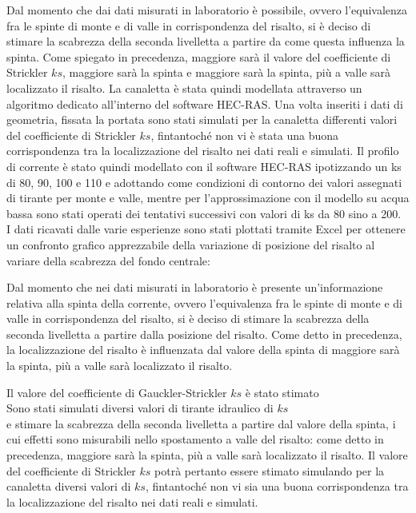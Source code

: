 \documentclass[12pt]{article} %
\begin{document}
\noindent Dal momento che dai dati misurati in laboratorio è possibile, ovvero l'equivalenza fra le spinte di monte e di valle in corrispondenza del risalto, si è deciso di stimare la scabrezza della seconda livelletta a partire da come questa influenza la spinta. Come spiegato in precedenza, maggiore sarà il valore del coefficiente di Strickler $ks$, maggiore sarà la spinta e maggiore sarà la spinta, più a valle sarà localizzato il risalto.
La canaletta è stata quindi modellata attraverso un algoritmo dedicato all'interno del software HEC-RAS. 
Una volta inseriti i dati di geometria, fissata la portata sono stati simulati per la canaletta differenti valori del coefficiente di Strickler $ks$, fintantoché non vi è stata una buona corrispondenza tra la localizzazione del risalto nei dati reali e simulati.
Il profilo di corrente è stato quindi modellato con il software HEC-RAS ipotizzando un ks di 80, 90, 100 e 110 e adottando come condizioni di contorno dei valori assegnati di tirante per monte e valle, mentre per l’approssimazione con il modello su acqua bassa sono stati operati dei tentativi successivi con valori di ks da 80 sino a 200.\\
I dati ricavati dalle varie esperienze sono stati plottati tramite Excel per ottenere un confronto grafico apprezzabile della variazione di posizione del risalto al variare della scabrezza del fondo centrale:

\noindent Dal momento che nei dati misurati in laboratorio è presente un'informazione relativa alla spinta della corrente, ovvero l'equivalenza fra le spinte di monte e di valle in corrispondenza del risalto, si è deciso di stimare la scabrezza della seconda livelletta a partire dalla posizione del risalto. Come detto in precedenza, la localizzazione del risalto è influenzata dal valore della spinta di maggiore sarà la spinta, più a valle sarà localizzato il risalto.


\noindent Il valore del coefficiente di Gauckler-Strickler $ks$ è stato stimato \\

 
Sono stati simulati diversi valori di tirante idraulico di $ks$ 
\\e stimare la scabrezza della seconda livelletta a partire dal valore della spinta, i cui effetti sono misurabili nello spostamento a valle del risalto: come detto in precedenza, maggiore sarà la spinta, più a valle sarà localizzato il risalto. Il valore del coefficiente di Strickler $ks$ potrà pertanto essere stimato simulando per la canaletta diversi valori di $ks$, fintantoché non vi sia una buona corrispondenza tra la localizzazione del risalto nei dati reali e simulati.\\
\end{document}

